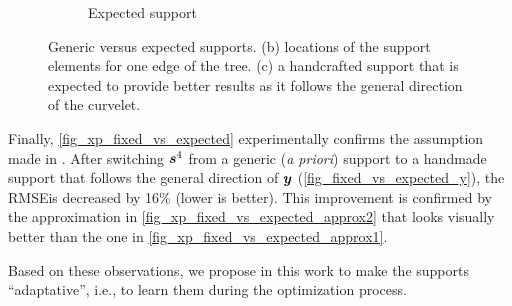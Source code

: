 \begin{figure}[!ht]
\begin{subfigure}[b]{0.32\textwidth}
	\caption{Expected support}
\end{subfigure}
\caption{Generic versus expected supports. (b) locations of the support elements for one edge of the tree. (c) a handcrafted support that is expected to provide better results as it follows the general direction of the curvelet.}\label{fig_fixed_vs_expected}
\end{figure}
\FloatBarrier

\noindent
Finally, \cref{fig_xp_fixed_vs_expected} experimentally confirms the assumption made in . After switching $\bm{s}^4$ from a generic (\textit{a priori}) support to a handmade support that follows the general direction of $\bm{y}$ (\cref{fig_fixed_vs_expected_y}), the RMSE\footnotemark[1] is decreased by 16\% (lower is better). This improvement is confirmed by the approximation in \cref{fig_xp_fixed_vs_expected_approx2} that looks visually better than the one in \cref{fig_xp_fixed_vs_expected_approx1}.

\noindent
Based on these observations, we propose in this work to make the supports “adaptative”, i.e., to learn them during the optimization process.


